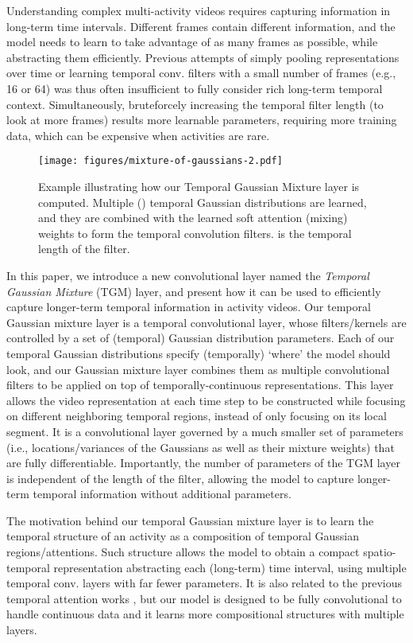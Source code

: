 \documentclass{article}
\begin{document}
Understanding complex multi-activity videos requires capturing information in long-term time intervals. Different frames contain different information, and the model needs to learn to take advantage of as many frames as possible, while abstracting them efficiently. Previous attempts of simply pooling representations over time or learning temporal conv. filters with a small number of frames (e.g., 16 or 64) was thus often insufficient to fully consider rich long-term temporal context. Simultaneously, bruteforcely increasing the temporal filter length (to look at more frames) results more learnable parameters, requiring more training data, which can be expensive when activities are rare.

\begin{figure}
    \centering
    \texttt{[image: figures/mixture-of-gaussians-2.pdf]}
    \caption{Example illustrating how our Temporal Gaussian Mixture layer is computed. Multiple () temporal Gaussian distributions are learned, and they are combined with the learned soft attention (mixing) weights to form the  temporal convolution filters.  is the temporal length of the filter.}
    \label{fig:mixture}
\end{figure}

In this paper, we introduce a new convolutional layer named the \emph{Temporal Gaussian Mixture} (TGM) layer, and present how it can be used to efficiently capture longer-term temporal information in activity videos. Our temporal Gaussian mixture layer is a temporal convolutional layer, whose filters/kernels are controlled by a set of (temporal) Gaussian distribution parameters. Each of our temporal Gaussian distributions specify (temporally) `where' the model should look, and our Gaussian mixture layer combines them as multiple convolutional filters to be applied on top of temporally-continuous representations. This layer allows the video representation at each time step to be constructed while focusing on different neighboring temporal regions, instead of only focusing on its local segment. It is a convolutional layer governed by a much smaller set of parameters (i.e., locations/variances of the Gaussians as well as their mixture weights) that are fully differentiable. Importantly, the number of parameters of the TGM layer is independent of the length of the filter, allowing the model to capture longer-term temporal information without additional parameters.


The motivation behind our temporal Gaussian mixture layer is to learn the temporal structure of an activity as a composition of temporal Gaussian regions/attentions. Such structure allows the model to obtain a compact spatio-temporal representation abstracting each (long-term) time interval, using multiple temporal conv. layers with far fewer parameters. 
It is also related to the previous temporal attention works \citep{piergiovanni2017learning}, but our model is designed to be fully convolutional to handle continuous data and it learns more compositional structures with multiple layers.
\end{document}
